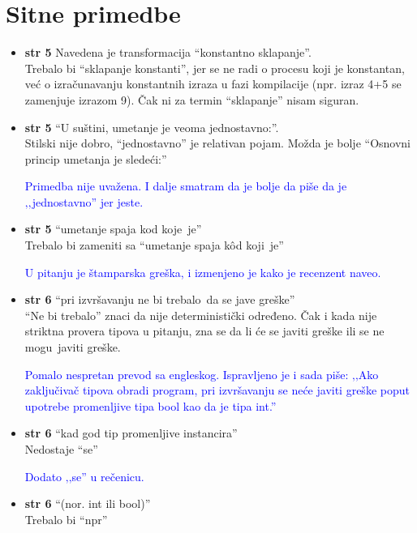\documentclass[a4paper]{report}
\newcommand{\odgovor}[1]{\textcolor{blue}{#1}}
\begin{document}
\section{Sitne primedbe}
\begin{itemize}
\item \textbf{str 5} Navedena je transformacija ``konstantno sklapanje''.\\Trebalo bi ``sklapanje konstanti'', jer se ne radi o procesu koji je konstantan, već o izračunavanju konstantnih izraza u fazi kompilacije (npr. izraz 4+5 se zamenjuje izrazom 9). Čak ni za termin ``sklapanje'' nisam siguran.

\item \textbf{str 5} ``U suštini, umetanje je veoma jednostavno:''.\\ Stilski nije dobro, ``jednostavno'' je relativan pojam. Možda je bolje ``Osnovni princip umetanja je sledeći:''

\odgovor{Primedba nije uvažena. I dalje smatram da je bolje da piše da je ‚‚jednostavno'' jer jeste.}

\item \textbf{str 5} ``umetanje spaja \color{blue}kod koje\color{black}~je''\\ Trebalo bi zameniti sa ``umetanje spaja \color{blue}kôd koji\color{black}~je''

\odgovor{U pitanju je štamparska greška, i izmenjeno je kako je recenzent naveo.}

\item \textbf{str 6} ``pri izvršavanju \color{blue}ne bi trebalo\color{black}~da se jave greške'' \\ ``Ne bi trebalo'' znaci da nije deterministički određeno. Čak i kada nije striktna provera tipova u pitanju, zna se da li će se javiti greške ili se \color{blue}ne mogu\color{black}~javiti greške.

\odgovor{Pomalo nespretan prevod sa engleskog. Ispravljeno je i sada piše: ‚‚Ako zaključivač tipova obradi program, pri izvršavanju se neće javiti greške poput upotrebe promenljive tipa bool kao da je tipa int.''}


\item \textbf{str 6} ``kad god tip promenljive instancira'' \\ Nedostaje ``se''

\odgovor{Dodato ‚‚se'' u rečenicu.}

\item \textbf{str 6} ``(\color{blue}nor\color{black}. int ili bool)'' \\ Trebalo bi ``npr''


\end{itemize}
\end{document}
